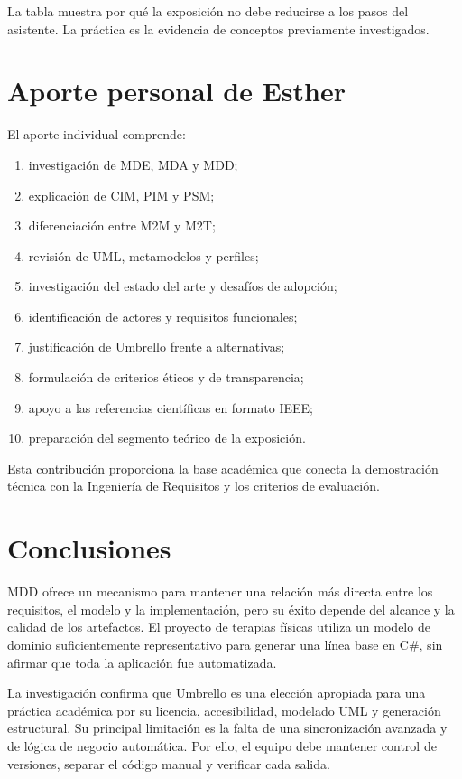 La tabla muestra por qué la exposición no debe reducirse a los pasos del asistente. La práctica es la evidencia de conceptos previamente investigados.

\section{Aporte personal de Esther}
El aporte individual comprende:
\begin{enumerate}
  \item investigación de MDE, MDA y MDD;
  \item explicación de CIM, PIM y PSM;
  \item diferenciación entre M2M y M2T;
  \item revisión de UML, metamodelos y perfiles;
  \item investigación del estado del arte y desafíos de adopción;
  \item identificación de actores y requisitos funcionales;
  \item justificación de Umbrello frente a alternativas;
  \item formulación de criterios éticos y de transparencia;
  \item apoyo a las referencias científicas en formato IEEE;
  \item preparación del segmento teórico de la exposición.
\end{enumerate}

Esta contribución proporciona la base académica que conecta la demostración técnica con la Ingeniería de Requisitos y los criterios de evaluación.

\section{Conclusiones}
MDD ofrece un mecanismo para mantener una relación más directa entre los requisitos, el modelo y la implementación, pero su éxito depende del alcance y la calidad de los artefactos. El proyecto de terapias físicas utiliza un modelo de dominio suficientemente representativo para generar una línea base en C\#, sin afirmar que toda la aplicación fue automatizada.

La investigación confirma que Umbrello es una elección apropiada para una práctica académica por su licencia, accesibilidad, modelado UML y generación estructural. Su principal limitación es la falta de una sincronización avanzada y de lógica de negocio automática. Por ello, el equipo debe mantener control de versiones, separar el código manual y verificar cada salida.


